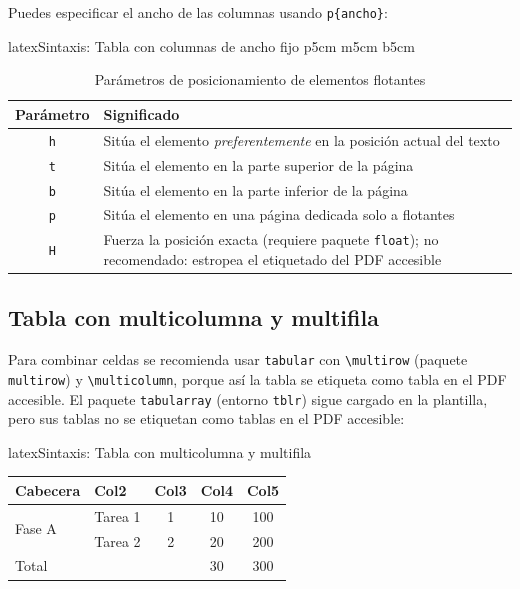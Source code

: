 Puedes especificar el ancho de las columnas usando \texttt{p\{ancho\}}:

\begin{codigosimple}{latex}{Sintaxis: Tabla con columnas de ancho fijo}
p{5cm}  %
m{5cm}  %
b{5cm}  %
\end{codigosimple}

\begin{table}[htbp]
  \centering
  \caption{Parámetros de posicionamiento de elementos flotantes}
  \label{tab:parametros}
  \EPScabeceraTabla
  \begin{tabular}{cp{10cm}}
    \toprule
    \textbf{Parámetro} & \textbf{Significado} \\
    \midrule
    \texttt{h} & Sitúa el elemento \emph{preferentemente} en la posición actual del texto \\
    \texttt{t} & Sitúa el elemento en la parte superior de la página \\
    \texttt{b} & Sitúa el elemento en la parte inferior de la página \\
    \texttt{p} & Sitúa el elemento en una página dedicada solo a flotantes \\
    \texttt{H} & Fuerza la posición exacta (requiere paquete \texttt{float}); no recomendado: estropea el etiquetado del PDF accesible \\
    \bottomrule
  \end{tabular}
\end{table}

\subsection{Tabla con multicolumna y multifila}
\label{subsec:tabla-multicolrow}

Para combinar celdas se recomienda usar \texttt{tabular} con \verb|\multirow| (paquete \texttt{multirow}) y \verb|\multicolumn|, porque así la tabla se etiqueta como tabla en el PDF accesible. El paquete \texttt{tabularray} (entorno \texttt{tblr}) sigue cargado en la plantilla, pero sus tablas no se etiquetan como tablas en el PDF accesible:

\begin{codigosimple}{latex}{Sintaxis: Tabla con multicolumna y multifila}
\begin{tabular}{llccc}
  \toprule
  Cabecera & Col2 & Col3 & Col4 & Col5 \\
  \midrule
  \multirow{2}{*}{Fase A} & Tarea 1 & 1 & 10 & 100 \\
                          & Tarea 2 & 2 & 20 & 200 \\
  \midrule
  \multicolumn{3}{l}{Total} & 30 & 300 \\  %
  \bottomrule
\end{tabular}
\end{codigosimple}

